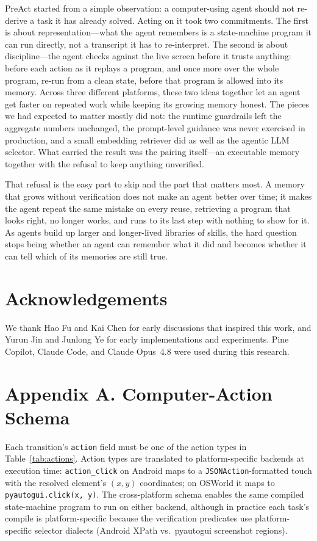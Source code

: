 \documentclass[11pt]{article}
\begin{document}
PreAct started from a simple observation: a computer-using agent should not re-derive a task it has already solved. Acting on it took two commitments. The first is about representation---what the agent remembers is a state-machine program it can run directly, not a transcript it has to re-interpret. The second is about discipline---the agent checks against the live screen before it trusts anything: before each action as it replays a program, and once more over the whole program, re-run from a clean state, before that program is allowed into its memory. Across three different platforms, these two ideas together let an agent get faster on repeated work while keeping its growing memory honest. The pieces we had expected to matter mostly did not: the runtime guardrails left the aggregate numbers unchanged, the prompt-level guidance was never exercised in production, and a small embedding retriever did as well as the agentic LLM selector. What carried the result was the pairing itself---an executable memory together with the refusal to keep anything unverified.

That refusal is the easy part to skip and the part that matters most. A memory that grows without verification does not make an agent better over time; it makes the agent repeat the same mistake on every reuse, retrieving a program that looks right, no longer works, and runs to its last step with nothing to show for it. As agents build up larger and longer-lived libraries of skills, the hard question stops being whether an agent can remember what it did and becomes whether it can tell which of its memories are still true.

\section*{Acknowledgements}

We thank Hao Fu and Kai Chen for early discussions that inspired this work, and Yurun Jin and Junlong Ye for early implementations and experiments. Pine Copilot, Claude Code, and Claude Opus~4.8 were used during this research.




\appendix
\section*{Appendix A. Computer-Action Schema}

Each transition's \texttt{action} field must be one of the action types in Table~\ref{tab:actions}. Action types are translated to platform-specific backends at execution time: \texttt{action\_click} on Android maps to a \texttt{JSONAction}-formatted touch with the resolved element's $(x, y)$ coordinates; on OSWorld it maps to \texttt{pyautogui.click(x, y)}. The cross-platform schema enables the same compiled state-machine program to run on either backend, although in practice each task's compile is platform-specific because the verification predicates use platform-specific selector dialects (Android XPath vs.\ pyautogui screenshot regions).
\end{document}
